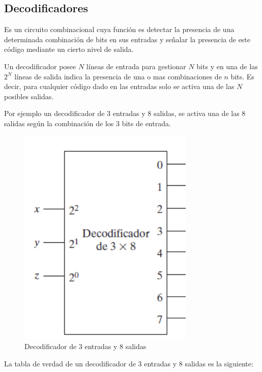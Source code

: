 \newpage
\subsection{Decodificadores}

Es un circuito combinacional cuya función es detectar la presencia de una determinada combinación de bits en sus entradas y señalar la presencia de este código mediante un cierto nivel de salida.

\begin{mdframed}[backgroundcolor=gray!10,linewidth=0]
Un decodificador posee $N$ líneas de entrada para gestionar $N$ bits y en una de las $2^N$ líneas de salida indica la presencia de una o mas combinaciones de $n$ bits. Es decir, para cualquier código dado en las entradas solo se activa una de las $N$ posibles salidas.
\end{mdframed}

Por ejemplo un decodificador de 3 entradas y 8 salidas, se activa una de las 8 salidas según la combinación de los 3 bits de entrada.

\begin{figure}[h]
\centering
\includegraphics[scale=0.5]{img/3a8.png}
\caption{Decodificador de 3 entradas y 8 salidas}
\end{figure}

La tabla de verdad de un decodificador de 3 entradas y 8 salidas es la siguiente:

